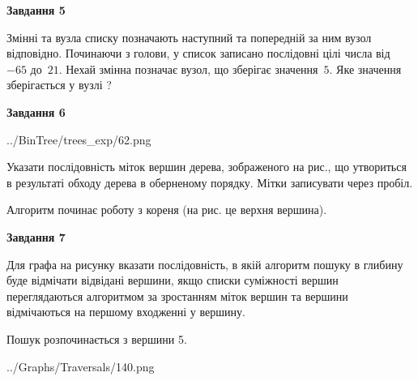 \documentclass[12pt, ukrainian]{article}
\begin{document}
{\begin {large}
{\begin {center}\textbf{Завдання 5}\end {center}}\par
Змінні  та  вузла списку позначають наступний та попередній за ним вузол відповідно. Починаючи з голови, у список записано послідовні цілі числа від~$-65$ до~$21$. Нехай змінна  позначає вузол, що зберігає значення~$5$.
Яке значення зберігається у вузлі  ?\par
\newpage

{\begin {center}\textbf{Завдання 6}\end {center}}\par

\begin{center}
	{../BinTree/trees_exp/62.png}
\end{center}
Указати послідовність міток вершин дерева, зображеного на рис., що утвориться в результаті обходу дерева в оберненому порядку. Мітки записувати через пробіл.\par Алгоритм починає роботу з кореня (на рис. це верхня вершина).\par
\newpage

{\begin {center}\textbf{Завдання 7}\end {center}}\par
Для графа на рисунку вказати послідовність, в якій алгоритм пошуку в глибину буде відмічати відвідані вершини, якщо списки суміжності вершин переглядаються алгоритмом за зростанням міток вершин та вершини відмічаються на першому вход\-женні у вершину.\par
Пошук розпочинається з вершини 5.\par

\begin{center}
	{../Graphs/Traversals/140.png}
\end{center}\par
\newpage


\end{large}}
\end{document}
